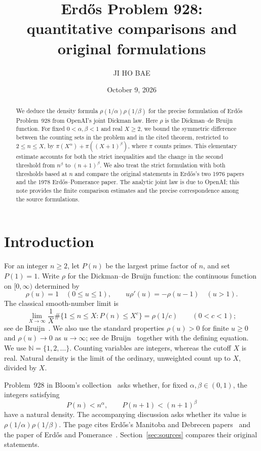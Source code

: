 \documentclass[11pt,a4paper]{amsart}
\title[Erd\H{o}s Problem 928 and the joint Dickman law]{Erd\H{o}s Problem 928:\\
quantitative comparisons and original formulations}
\author{JI HO BAE}
\date{October 9, 2026}
\newcommand{\N}{\mathbb N}
\begin{document}
\begin{abstract}
We deduce the density formula $\rho(1/\alpha)\rho(1/\beta)$ for the
precise formulation of Erd\H{o}s Problem~928 from OpenAI's joint
Dickman law. Here $\rho$ is the Dickman--de Bruijn function.
For fixed $0<\alpha,\beta<1$ and real $X\ge2$, we bound the symmetric
difference between the counting sets in the problem and in the cited
theorem, restricted to $2\le n\le X$, by
$\pi(X^\alpha)+\pi((X+1)^\beta)$, where $\pi$ counts primes.
This elementary estimate accounts for both the strict inequalities and
the change in the second threshold from $n^\beta$ to $(n+1)^\beta$.
We also treat the strict formulation with both thresholds based at $n$
and compare the original statements in Erd\H{o}s's two 1976 papers and
the 1978 Erd\H{o}s--Pomerance paper. The analytic joint law is due to
OpenAI; this note provides the finite comparison estimates and the
precise correspondence among the source formulations.
\end{abstract}
\maketitle

\section{Introduction}

For an integer $n\ge2$, let $P(n)$ be the largest prime factor of $n$, and set
$P(1)=1$. Write $\rho$ for the Dickman--de Bruijn function: the continuous
function on $[0,\infty)$ determined by
\[
 \rho(u)=1\quad(0\le u\le1),\qquad
 u\rho'(u)=-\rho(u-1)\quad(u>1).
\]
The classical smooth-number limit is
\begin{equation}\label{eq:marginal}
 \lim_{X\to\infty}\frac1X
 \#\{1\le n\le X:P(n)\le X^c\}=\rho(1/c)
 \qquad(0<c<1);
\end{equation}
see de Bruijn~\cite[p.~51, (1.1)--(1.2)]{deBruijn1951}.
We also use the standard properties $\rho(u)>0$ for finite $u\ge0$
and $\rho(u)\to0$ as $u\to\infty$; see
de Bruijn~\cite[p.~52, (1.8)]{deBruijn1951} together with the defining equation.
We use $\N=\{1,2,\ldots\}$. Counting variables are integers, whereas
the cutoff $X$ is real. Natural density is the limit of the ordinary,
unweighted count up to $X$, divided by $X$.

Problem~928 in Bloom's collection~\cite{Bloom928} asks whether, for fixed
$\alpha,\beta\in(0,1)$, the integers satisfying
\begin{equation}\label{eq:problem}
 P(n)<n^\alpha,\qquad P(n+1)<(n+1)^\beta
\end{equation}
have a natural density. The accompanying discussion asks whether its
value is $\rho(1/\alpha)\rho(1/\beta)$. The page cites Erd\H{o}s's
Manitoba and Debrecen papers~\cite{Erdos1976Manitoba,Erdos1976Debrecen}
and the paper of Erd\H{o}s and Pomerance~\cite{ErdosPomerance1978}.
Section~\ref{sec:sources} compares their original statements.
\end{document}

